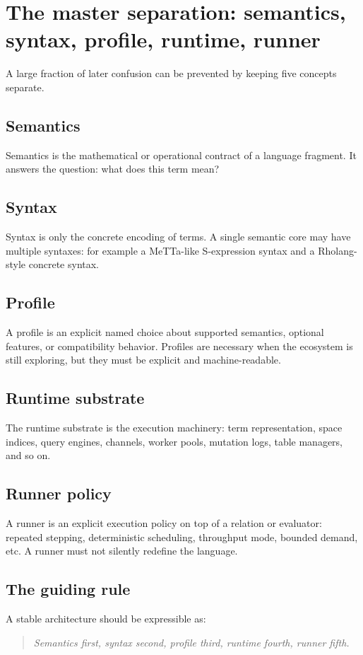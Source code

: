\documentclass[11pt]{article}
\begin{document}
\section{The master separation: semantics, syntax, profile, runtime, runner}
A large fraction of later confusion can be prevented by keeping five concepts separate.

\subsection{Semantics}
Semantics is the mathematical or operational contract of a language fragment. It answers the question: what does this term mean?

\subsection{Syntax}
Syntax is only the concrete encoding of terms. A single semantic core may have multiple syntaxes: for example a MeTTa-like S-expression syntax and a Rholang-style concrete syntax.

\subsection{Profile}
A profile is an explicit named choice about supported semantics, optional features, or compatibility behavior. Profiles are necessary when the ecosystem is still exploring, but they must be explicit and machine-readable.

\subsection{Runtime substrate}
The runtime substrate is the execution machinery: term representation, space indices, query engines, channels, worker pools, mutation logs, table managers, and so on.

\subsection{Runner policy}
A runner is an explicit execution policy on top of a relation or evaluator: repeated stepping, deterministic scheduling, throughput mode, bounded demand, etc. A runner must not silently redefine the language.

\subsection{The guiding rule}
A stable architecture should be expressible as:
\begin{quote}
\emph{Semantics first, syntax second, profile third, runtime fourth, runner fifth.}
\end{quote}
\end{document}
